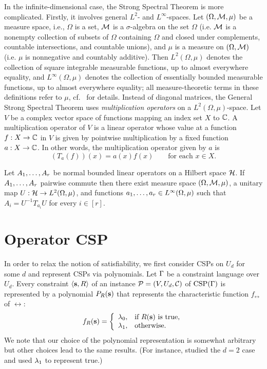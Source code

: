 \documentclass[11pt,letter]{article}
\begin{document}
In the infinite-dimensional case, the Strong Spectral Theorem is more
complicated. Firstly, it involves general $L^2$- and $L^\infty$-spaces. Let
$(\Omega,{\mathcal M},\mu)$ be a measure space, i.e., $\Omega$ is a set, ${\mathcal M}$ is a
$\sigma$-algebra on the set $\Omega$ (i.e. ${\mathcal M}$ is a nonempty collection of
subsets of $\Omega$ containing $\Omega$ and closed under complements, countable intersections, and
countable unions), and $\mu$ is a measure on $(\Omega,{\mathcal M})$ (i.e. $\mu$ is
nonnegative and countably additive). Then $L^2(\Omega,\mu)$ denotes
the collection of square integrable measurable functions, up to almost
everywhere equality, and $L^\infty(\Omega,\mu)$ denotes the
collection of essentially bounded measurable functions, up to almost everywhere equality; all measure-theoretic terms in
these definitions refer to $\mu$, cf.~\cite{Folland94} for details. Instead of diagonal matrices, the General Strong Spectral Theorem uses \emph{multiplication operators} on a $L^2(\Omega,\mu)$-space. Let $V$ be a complex vector space of functions mapping an index set $X$ to ${\mathbb C}$. A multiplication operator of $V$ is a linear operator whose value at a function $f:X\to{\mathbb C}$ in $V$ is given by pointwise multiplication by a fixed function $a:X\to{\mathbb C}$. In other words, the multiplication operator given by $a$ is
\[
(T_a(f))(x)=a(x)f(x)\qquad\text{for each $x\in X$}.
\]

\begin{theorem}\label{the:general-sst}
Let $A _1,\ldots, A _{r}$ be normal bounded linear operators on a Hilbert space ${\mathcal H}$. If $A _1,\ldots, A _{r}$ pairwise commute then there exist measure space $(\Omega,{\mathcal M},\mu)$, a unitary map $U:{\mathcal H}\to L^2(\Omega,\mu)$, and functions $a _1,\ldots, a _{r}\in L^\infty(\Omega,\mu)$ such that $A_i=U^{-1}T_{a_i}U$ for every $i\in[r]$.
\end{theorem}

 
\section{Operator CSP}\label{sec:operator-CSP}

In order to relax the notion of satisfiability, we first consider CSPs on $U_d$
for some $d$ and represent CSPs via polynomials. Let $\Gamma$ be a constraint 
language over $U_d$. Every constraint $\langle {\bf s},R \rangle$ of an instance 
${\mathcal P}=(V,U_d,{\mathcal C})$ of ${\rm CSP}(\Gamma)$ is represented by a polynomial 
$P_R({\bf s})$ that represents the characteristic function $f_\rel$ of
$\rel$:
\[
f_R({\bf s})=\left\{\begin{array}{ll}
  \lambda_0, & \text{if $R({\bf s})$ is true,}\\
  \lambda_1, & \text{otherwise}.
\end{array}\right.
\]
We note that our choice of the polynomial representation is somewhat arbitrary
but other choices lead to the same results. (For instance, \cite{AKS19:jcss}
studied the $d=2$ case and used $\lambda_1$ to represent true.) 
\end{document}
